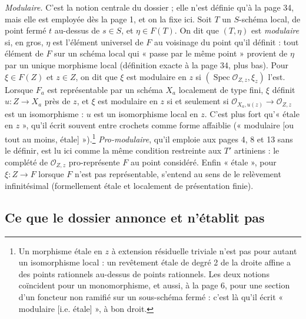\documentclass[11pt,a4paper]{article}
\begin{document}
\emph{Modulaire.} C'est la notion centrale du dossier ; elle n'est définie
qu'à la page 34, mais elle est employée dès la page 1, et on la fixe ici. Soit
$T$ un $S$-schéma local, de point fermé $t$ au-dessus de $s \in S$, et $\eta
\in F(T)$. On dit que $(T, \eta)$ est \emph{modulaire} si, en gros, $\eta$ est
l'élément universel de $F$ au voisinage du point qu'il définit : tout
élément de $F$ sur un schéma local qui « passe par le même point » provient de
$\eta$ par un unique morphisme local (définition exacte à la page 34, plus
bas). Pour $\xi \in F(Z)$ et $z \in Z$, on dit que $\xi$ est modulaire en
$z$ si $(\operatorname{Spec} \mathcal{O}_{Z,z}, \xi_z)$ l'est. Lorsque $F_a$
est représentable par un schéma $X_a$ localement de type fini, $\xi$ définit
$u : Z \to X_a$ près de $z$, et $\xi$ est modulaire en $z$ si et seulement si
$\mathcal{O}_{X_a, u(z)} \to \mathcal{O}_{Z,z}$ est un isomorphisme : $u$ est
un isomorphisme local en $z$. C'est plus fort qu'« étale en $z$ », qu'il
écrit souvent entre crochets comme forme affaiblie (« modulaire [ou tout au
moins, étale] »).\footnote{Un morphisme étale en $z$ à extension résiduelle
triviale n'est pas pour autant un isomorphisme local : un revêtement étale de
degré 2 de la droite affine a des points rationnels au-dessus de points
rationnels. Les deux notions coïncident pour un monomorphisme, et aussi, à la
page 6, pour une section d'un foncteur non ramifié sur un sous-schéma fermé :
c'est là qu'il écrit « modulaire [i.e. étale] », à bon droit.}
\emph{Pro-modulaire}, qu'il emploie aux pages 4, 8 et 13 sans le définir, est
lu ici comme la même condition restreinte aux $T'$ artiniens : le complété de
$\mathcal{O}_{Z,z}$ pro-représente $F$ au point considéré. Enfin « étale »,
pour $\xi : Z \to F$ lorsque $F$ n'est pas représentable, s'entend au sens de
le relèvement infinitésimal (formellement étale et localement de
présentation finie).

\subsection*{Ce que le dossier annonce et n'établit pas}
\end{document}
